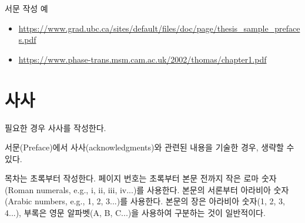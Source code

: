 \documentclass[11pt]{report}
\begin{document}
\bigskip
서문 작성 예
\begin{itemize}
\item\url{https://www.grad.ubc.ca/sites/default/files/doc/page/thesis_sample_prefaces.pdf}
\item\url{https://www.phase-trans.msm.cam.ac.uk/2002/thomas/chapter1.pdf}
\end{itemize}


\newpage
{}
\chapter*{사사}

\normalsize
필요한 경우 사사를 작성한다. \par
서문(Preface)에서 사사(acknowledgments)와 관련된 내용을 기술한 경우, 생략할 수 있다.


\newpage
\renewcommand*\contentsname{목차}
\tableofcontents


\vspace{2cm}

목차는 초록부터 작성한다.
페이지 번호는 초록부터 본문 전까지 작은 로마 숫자(Roman numerals, e.g., i, ii, iii, iv...)를 사용한다. 본문의 서론부터 아라비아 숫자(Arabic numbers, e.g., 1, 2, 3...)를 사용한다. 
본문의 장은 아라비아 숫자(1, 2, 3, 4...), 부록은 영문 알파벳(A, B, C...)을 사용하여 구분하는 것이 일반적이다.


\renewcommand{\listtablename}{표 목차}
\listoftables



\renewcommand{\listfigurename}{그림 목차}
\listoffigures
\end{document}
